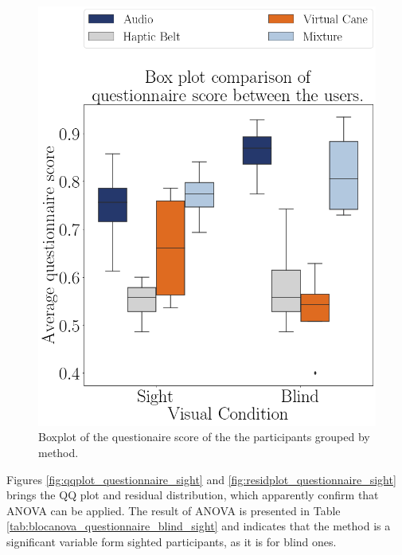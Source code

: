 \begin{figure}[!htb]
    \centering
    \includegraphics[width = 0.6\linewidth]{Resultados/Questionario/Figuras/png/boxplot_questionnaire_scene.png}
    \caption{Boxplot of the questionaire score of the the participants grouped by method.}
    \label{fig:boxplot_questionnaire_scene}
\end{figure}

%
%
%

Figures \ref{fig:qqplot_questionnaire_sight} and \ref{fig:residplot_questionnaire_sight} brings the QQ plot and residual distribution, which apparently confirm that ANOVA can be applied. The result of ANOVA is presented in Table \ref{tab:blocanova_questionnaire_blind_sight} and indicates that the method is a significant variable form sighted participants, as it is for blind ones.

